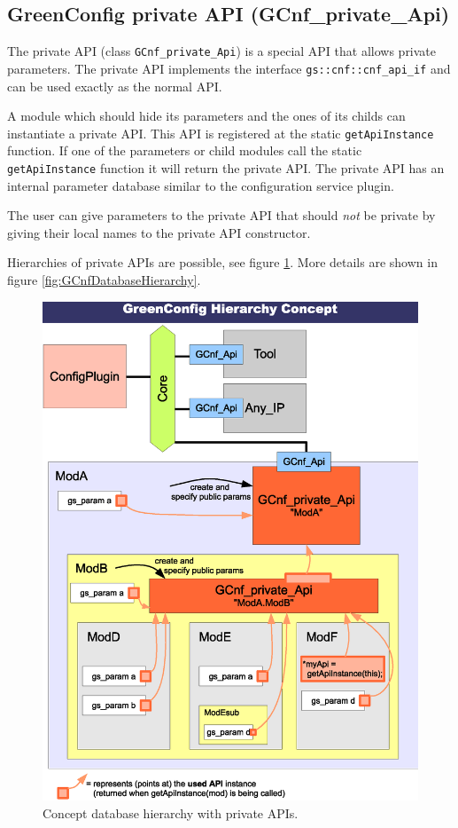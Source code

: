 \subsection{GreenConfig private API (GCnf\_private\_Api)}
\label{GCnfPrivateApi}

The \GreenConfig private API (class \lstinline|GCnf_private_Api|) is a special API that allows private parameters. The private API implements the interface \lstinline|gs::cnf::cnf_api_if| and can be used exactly as the normal API.

A module which should hide its parameters and the ones of its childs can instantiate a private API. This API is registered at the static \lstinline|getApiInstance| function. If one of the parameters or child modules call the static \lstinline|getApiInstance| function it will return the private API. The private API has an internal parameter database similar to the configuration service plugin.

The user can give parameters to the private API that should {\em not} be private by giving their local names to the private API constructor.

Hierarchies of private APIs are possible, see figure \ref{fig:GCnfDatabaseHierarchyConcept}. More details are shown in figure \ref{fig:GCnfDatabaseHierarchy}.

\begin{figure}[htbp]
	\centerline{
		\includegraphics[width=14cm]{DatabaseHierarchyConcept.eps}}
	\caption{Concept database hierarchy with private APIs.}
	\label{fig:GCnfDatabaseHierarchyConcept}
\end{figure}


